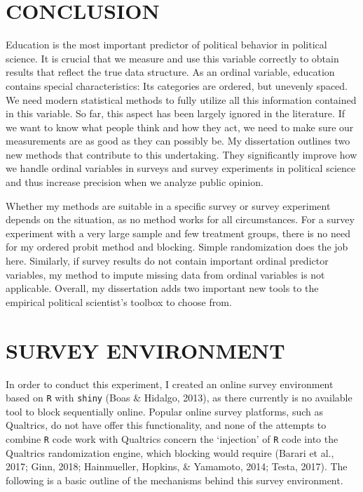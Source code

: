 \documentclass[12pt,econ]{sources/authesis}
\begin{document}
\hypertarget{conclusion}{%
\chapter{CONCLUSION}\label{conclusion}}

Education is the most important predictor of political behavior in political science. It is crucial that we measure and use this variable correctly to obtain results that reflect the true data structure. As an ordinal variable, education contains special characteristics: Its categories are ordered, but unevenly spaced. We need modern statistical methods to fully utilize all this information contained in this variable. So far, this aspect has been largely ignored in the literature. If we want to know what people think and how they act, we need to make sure our measurements are as good as they can possibly be. My dissertation outlines two new methods that contribute to this undertaking. They significantly improve how we handle ordinal variables in surveys and survey experiments in political science and thus increase precision when we analyze public opinion.

Whether my methods are suitable in a specific survey or survey experiment depends on the situation, as no method works for all circumstances. For a survey experiment with a very large sample and few treatment groups, there is no need for my ordered probit method and blocking. Simple randomization does the job here. Similarly, if survey results do not contain important ordinal predictor variables, my method to impute missing data from ordinal variables is not applicable. Overall, my dissertation adds two important new tools to the empirical political scientist's toolbox to choose from.

\appendix

\hypertarget{app-survey}{%
\chapter{SURVEY ENVIRONMENT}\label{app-survey}}

In order to conduct this experiment, I created an online survey environment based on \texttt{R} with \texttt{shiny} (Boas \& Hidalgo, 2013), as there currently is no available tool to block sequentially online. Popular online survey platforms, such as Qualtrics, do not have offer this functionality, and none of the attempts to combine \texttt{R} code work with Qualtrics concern the `injection' of \texttt{R} code into the Qualtrics randomization engine, which blocking would require (Barari et al., 2017; Ginn, 2018; Hainmueller, Hopkins, \& Yamamoto, 2014; Testa, 2017). The following is a basic outline of the mechanisms behind this survey environment.
\end{document}
